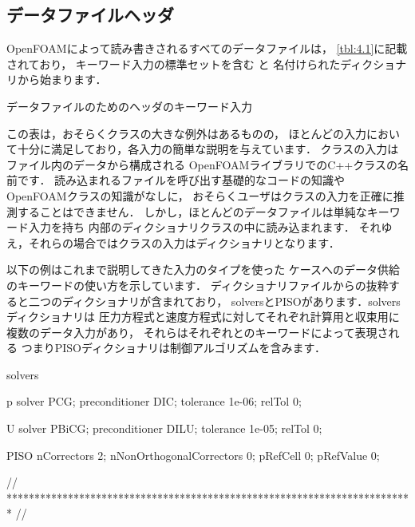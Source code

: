 \subsection{データファイルヘッダ}
\label{ssec:4.2.3}
OpenFOAMによって読み書きされるすべてのデータファイルは，
\autoref{tbl:4.1}に記載されており，
キーワード入力の標準セットを含む
%
%
と
名付けられたディクショナリから始まります．


\begin{table}[ht]
 
 \caption{データファイルのためのヘッダのキーワード入力}
 \label{tbl:4.1}
\end{table}


この表は，おそらくクラスの大きな例外はあるものの，
ほとんどの入力において十分に満足しており，各入力の簡単な説明を与えています．
クラスの入力はファイル内のデータから構成される
OpenFOAMライブラリでのC++クラスの名前です．
読み込まれるファイルを呼び出す基礎的なコードの知識や
OpenFOAMクラスの知識がなしに，
おそらくユーザはクラスの入力を正確に推測することはできません．
しかし，ほとんどのデータファイルは単純なキーワード入力を持ち
内部のディクショナリクラスの中に読み込まれます．
それゆえ，それらの場合ではクラスの入力はディクショナリとなります．

以下の例はこれまで説明してきた入力のタイプを使った
ケースへのデータ供給のキーワードの使い方を示しています．
ディクショナリファイルからの抜粋すると二つのディクショナリが含まれており，
solversとPISOがあります．solversディクショナリは
圧力方程式と速度方程式に対してそれぞれ計算用と収束用に複数のデータ入力があり，
それらはそれぞれとのキーワードによって表現される
つまりPISOディクショナリは制御アルゴリズムを含みます．
\begin{OFverbatim}[file, linenum=17]

solvers
{
    p
    {
        solver           PCG;
        preconditioner   DIC;
        tolerance        1e-06;
        relTol           0;
    }

    U
    {
        solver           PBiCG;
        preconditioner   DILU;
        tolerance        1e-05;
        relTol           0;
    }
}

PISO
{
    nCorrectors     2;
    nNonOrthogonalCorrectors 0;
    pRefCell        0;
    pRefValue       0;
}


// ************************************************************************* //
\end{OFverbatim}



